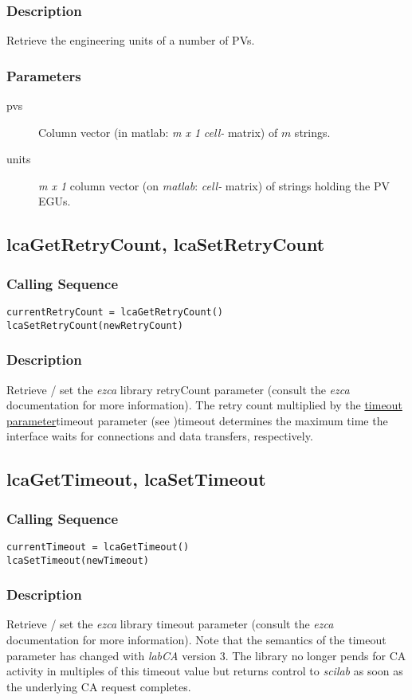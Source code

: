 \documentclass{article}
\newcommand{\sca}{\ita{labCA}}
\newcommand{\scilab}{\ita{scilab}}
\newcommand{\matlab}{\ita{matlab}}
\newcommand{\ezca}{\ita{ezca}}
\newcommand{\pbrk}{\pagebreak[3]}
\newcommand{\ita}[1]{\emph{#1}}
\newcommand{\m}{$m$}
\newcommand{\mhack}{$m$} %
\newcommand{\mxl}{$m\times 1$}
\renewcommand{\m}{\ita{m}}
\newcommand{\mhack}{\ita{m}} %
\renewcommand{\mxl}{\ita{m x 1}}
\renewcommand{\pbrk}{}
\newcommand{\PVITEM}{
\item[pvs] Column vector (in matlab: \mxl{} \ita{cell-} matrix)
of \mhack{} strings.
}
\begin{document}
\subsubsection{Description}
Retrieve the engineering units of a number of PVs.
\subsubsection{Parameters}
\begin{description}
\PVITEM
\item[units] \mxl{} column vector (on \matlab: \ita{cell-} matrix)
of strings holding the PV EGUs.
\end{description}

\vspace*{\fill}
\pbrk
\subsection{lcaGetRetryCount, lcaSetRetryCount}
\label{retrycnt}
\subsubsection{Calling Sequence}
\begin{verbatim}
currentRetryCount = lcaGetRetryCount()
lcaSetRetryCount(newRetryCount)
\end{verbatim}
\subsubsection{Description}
Retrieve / set the \ezca{} library retryCount parameter (consult the \ezca{}
documentation for more information). The retry count multiplied by the
\hyperref[ref]{timeout parameter}{timeout parameter (see }{ )}{timeout}
determines the maximum time the interface waits for connections and data
transfers, respectively.

\vspace*{\fill}
\pbrk
\subsection{lcaGetTimeout, lcaSetTimeout}
\label{timeout}
\subsubsection{Calling Sequence}
\begin{verbatim}
currentTimeout = lcaGetTimeout()
lcaSetTimeout(newTimeout)
\end{verbatim}
\subsubsection{Description}
Retrieve / set the \ezca{} library timeout parameter (consult the \ezca{}
documentation for more information). Note that the semantics of the
timeout parameter has changed with \sca{} version 3. The library no longer
pends for CA activity in multiples of this timeout value but returns
control to \scilab{} as soon as the underlying CA request completes.
\end{document}
